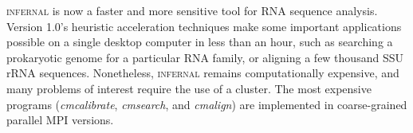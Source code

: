 
\textsc{infernal} is now a faster and more sensitive tool for RNA
sequence analysis.  Version 1.0's heuristic acceleration techniques
make some important applications possible on a single desktop computer
in less than an hour, such as searching a prokaryotic genome for a
particular RNA family, or aligning a few thousand SSU rRNA sequences.
Nonetheless, \textsc{infernal} remains computationally expensive, and many
problems of interest require the use of a cluster.  The most expensive
programs (\emph{cmcalibrate}, \emph{cmsearch}, and \emph{cmalign}) are
implemented in coarse-grained parallel MPI versions.
